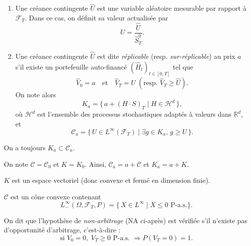 \begin{definition}
\begin{enumerate}[label=(\alph*)]
\item Une créance contingente $\hat U$ est une variable aléatoire mesurable par rapport à $\mathcal{F}_T$.  
Dans ce cas, on définit sa valeur actualisée par
\begin{equation}
U = \frac{\hat U}{\hat S_T^0}.
\end{equation}

\item Une créance contingente $\hat U$ est dite \emph{réplicable} (resp. \emph{sur-réplicable}) au prix $a$ s'il existe un portefeuille auto-financé $(\hat H_t)_{t\in[0,T]}$ tel que
\begin{equation}
\hat V_0 = a \quad \text{et} \quad \hat V_T = \hat U \; (\text{resp. } \hat V_T \ge \hat U).
\end{equation}
On note alors
\begin{equation}
K_a = \bigl\{\, a + (H \cdot S)_T \;|\; H \in \mathcal{H}^d \,\bigr\},
\end{equation}
où $\mathcal{H}^d$ est l'ensemble des processus stochastiques adaptés à valeurs dans $\mathbb{R}^d$, et
\begin{equation}
\mathcal{C}_a = \bigl\{\, U \in L^\infty(\mathcal{F}_T) \;|\; \exists g \in K_a,\, g \ge U \,\bigr\}.
\end{equation}
\end{enumerate}
On a toujours $K_a \subset \mathcal{C}_a$.
\end{definition}

\begin{remarques}
\item[(a)] On note $\mathcal{C} = \mathcal{C}_0$ et $K = K_0$. Ainsi, $\mathcal{C}_a = a + \mathcal{C}$ et $K_a = a + K$.

\item[(b)] $K$ est un espace vectoriel (donc convexe et fermé en dimension finie).

\item[(c)] $\mathcal{C}$ est un cône convexe contenant
\[
L_-^\infty(\Omega, \mathcal{F}_T, P) = \{\, X \in L^\infty \mid X \le 0 \text{ P-a.s.} \}.
\]
\end{remarques}

\begin{definition}
On dit que l'hypothèse de \emph{non-arbitrage} (NA ci-après) est vérifiée s'il n'existe pas d'opportunité d'arbitrage, c'est-à-dire :
\begin{equation}
\text{si } V_0 = 0, \; V_T \ge 0 \text{ P-a.s. } \Rightarrow P(V_T = 0) = 1.
\end{equation}
\end{definition}

